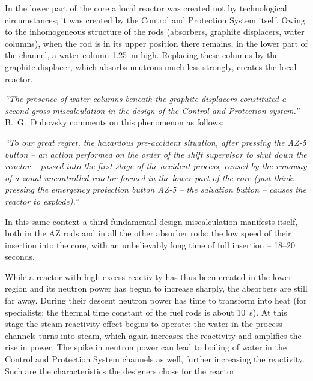 \documentclass[openright]{bookest}
\begin{document}

In the lower part of the core a local reactor was created not by technological circumstances; it was created by the Control and Protection System itself. Owing to the inhomogeneous structure of the rods (absorbers, graphite displacers, water columns), when the rod is in its upper position there remains, in the lower part of the channel, a water column \qty{1.25}{\metre} high. Replacing these columns by the graphite displacer, which absorbs neutrons much less strongly, creates the local reactor.

\textit{``The presence of water columns beneath the graphite displacers constituted a second gross miscalculation in the design of the Control and Protection system.''} B.~G.~Dubovsky comments on this phenomenon as follows:

\begin{personal}
  \textit{``To our great regret, the hazardous pre-accident situation, after pressing the AZ-5 button -- an action performed on the order of the shift supervisor to shut down the reactor -- passed into the first stage of the accident process, caused by the runaway of a zonal uncontrolled reactor formed in the lower part of the core (just think: pressing the emergency protection button AZ-5 -- the salvation button -- causes the reactor to explode).''}
\end{personal}

In this same context a third fundamental design miscalculation manifests itself, both in the AZ rods and in all the other absorber rods: the low speed of their insertion into the core, with an unbelievably long time of full insertion -- \numrange{18}{20} seconds.


While a reactor with high excess reactivity has thus been created in the lower region and its neutron power has begun to increase sharply, the absorbers are still far away. During their descent neutron power has time to transform into heat (for specialists: the thermal time constant of the fuel rods is about \qty{10}{\second}). At this stage the steam reactivity effect begins to operate: the water in the process channels turns into steam, which again increases the reactivity and amplifies the rise in power. The spike in neutron power can lead to boiling of water in the Control and Protection System channels as well, further increasing the reactivity. Such are the characteristics the designers chose for the reactor.
\end{document}

